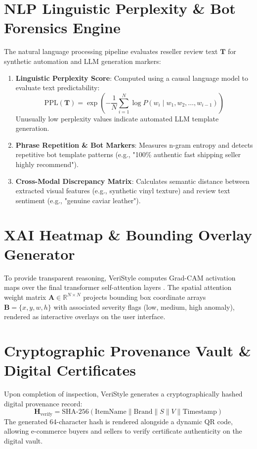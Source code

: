 \documentclass[a4paper,12pt]{report}
\begin{document}
\section{NLP Linguistic Perplexity \& Bot Forensics Engine}
The natural language processing pipeline evaluates reseller review text $\mathbf{T}$ for synthetic automation and LLM generation markers:
\begin{enumerate}
    \item \textbf{Linguistic Perplexity Score}: Computed using a causal language model to evaluate text predictability:
    \begin{equation}
        \text{PPL}(\mathbf{T}) = \exp \left( -\frac{1}{N} \sum_{i=1}^{N} \log P(w_i \mid w_1, w_2, \dots, w_{i-1}) \right)
    \end{equation}
    Unusually low perplexity values indicate automated LLM template generation.
    \item \textbf{Phrase Repetition \& Bot Markers}: Measures n-gram entropy and detects repetitive bot template patterns (e.g., "100\% authentic fast shipping seller highly recommend").
    \item \textbf{Cross-Modal Discrepancy Matrix}: Calculates semantic distance between extracted visual features (e.g., synthetic vinyl texture) and review text sentiment (e.g., "genuine caviar leather").
\end{enumerate}

\section{XAI Heatmap \& Bounding Overlay Generator}
To provide transparent reasoning, VeriStyle computes Grad-CAM activation maps over the final transformer self-attention layers \cite{dosovitskiy2020image}. The spatial attention weight matrix $\mathbf{A} \in \mathbb{R}^{N \times N}$ projects bounding box coordinate arrays $\mathbf{B} = \{x, y, w, h\}$ with associated severity flags (low, medium, high anomaly), rendered as interactive overlays on the user interface.

\section{Cryptographic Provenance Vault \& Digital Certificates}
Upon completion of inspection, VeriStyle generates a cryptographically hashed digital provenance record:
\begin{equation}
    \mathbf{H}_{\text{verify}} = \text{SHA-256}(\text{ItemName} \parallel \text{Brand} \parallel S \parallel V \parallel \text{Timestamp})
\end{equation}
The generated 64-character hash is rendered alongside a dynamic QR code, allowing e-commerce buyers and sellers to verify certificate authenticity on the digital vault.
\end{document}
